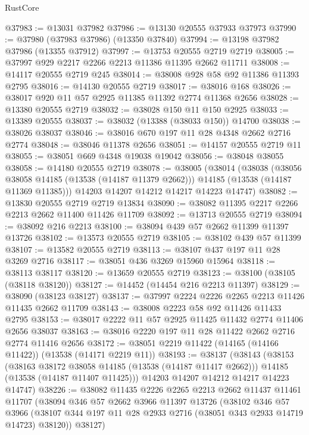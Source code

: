 \begin{lexlean}{RustCore}
\begin{coremodule}
@37983 := @13031 @37982
@37986 := @13130 @20555 @37933 @37973
@37990 := @37980 (@37983 @37986) (@13350 @37840)
@37994 := @13198 @37982 @37986 (@13355 @37912)
@37997 := @13753 @20555 @2719 @2719
@38005 := @37997 @929 @2217 @2266 @2213 @11386 @11395 @2662 @11711
@38008 := @14117 @20555 @2719 @245
@38014 := @38008 @928 @58 @92 @11386 @11393 @2795
@38016 := @14130 @20555 @2719
@38017 := @38016 @168
@38026 := @38017 @920 @11 @57 @2925 @11385 @11392 @2774 @11368 @2656
@38028 := @13380 @20555 @2719
@38032 := @38028 @150 @11 @150 @2925
@38033 := @13389 @20555
@38037 := @38032 (@13388 (@38033 @150)) @14700
@38038 := @38026 @38037
@38046 := @38016 @670 @197 @11 @28 @4348 @2662 @2716 @2774
@38048 := @38046 @11378 @2656
@38051 := @14157 @20555 @2719 @11
@38055 := @38051 @669 @4348 @19038 @19042
@38056 := @38048 @38055
@38058 := @14180 @20555 @2719
@38078 := @38005
    (@38014
      (@38038
        (@38056 @38058 @14185 (@13538 (@14187 @11379 @2662)))
        @14185
        (@13538 (@14187 @11369 @11385)))
      @14203
      @14207
      @14212
      @14217
      @14223
      @14747)
@38082 := @13830 @20555 @2719 @2719 @13834
@38090 := @38082 @11395 @2217 @2266 @2213 @2662 @11400 @11426 @11709
@38092 := @13713 @20555 @2719
@38094 := @38092 @216 @2213
@38100 := @38094 @439 @57 @2662 @11399 @11397 @13726
@38102 := @13573 @20555 @2719
@38105 := @38102 @439 @57 @11399
@38107 := @13582 @20555 @2719
@38113 := @38107 @437 @197 @11 @28 @3269 @2716
@38117 := @38051 @436 @3269 @15960 @15964
@38118 := @38113 @38117
@38120 := @13659 @20555 @2719
@38123 := @38100 (@38105 (@38118 @38120))
@38127 := @14452 (@14454 @216 @2213 @11397)
@38129 := @38090 (@38123 @38127)
@38137 := @37997 @2224 @2226 @2265 @2213 @11426 @11435 @2662 @11709
@38143 := @38008 @2223 @58 @92 @11426 @11433 @2795
@38153 := @38017 @2222 @11 @57 @2925 @11425 @11432 @2774 @11406 @2656 @38037
@38163 := @38016 @2220 @197 @11 @28 @11422 @2662 @2716 @2774 @11416 @2656
@38172 := @38051 @2219 @11422 (@14165 (@14166 @11422)) (@13538 (@14171 @2219 @11))
@38193 := @38137
    (@38143
      (@38153
        (@38163 @38172 @38058 @14185 (@13538 (@14187 @11417 @2662)))
        @14185
        (@13538 (@14187 @11407 @11425)))
      @14203
      @14207
      @14212
      @14217
      @14223
      @14747)
@38226 := @38082
    @11435
    @2226
    @2265
    @2213
    @2662
    @11437
    @11461
    @11707
    (@38094
      @346
      @57
      @2662
      @3966
      @11397
      @13726
      (@38102
        @346
        @57
        @3966
        (@38107 @344 @197 @11 @28 @2933 @2716 (@38051 @343 @2933 @14719 @14723) @38120))
      @38127)

\end{coremodule}
\end{lexlean}
